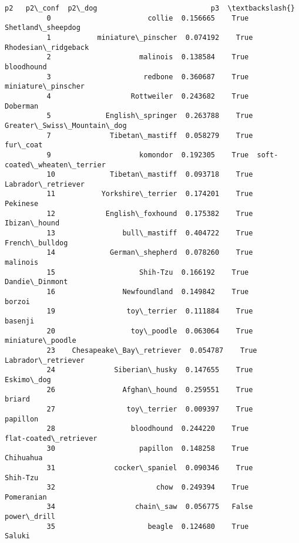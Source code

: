 \documentclass[11pt]{article}
\begin{document}
\begin{Verbatim}[commandchars=\\\{\}]
                                      p2   p2\_conf  p2\_dog                           p3  \textbackslash{}
          0                       collie  0.156665    True            Shetland\_sheepdog   
          1           miniature\_pinscher  0.074192    True          Rhodesian\_ridgeback   
          2                     malinois  0.138584    True                   bloodhound   
          3                      redbone  0.360687    True           miniature\_pinscher   
          4                   Rottweiler  0.243682    True                     Doberman   
          5             English\_springer  0.263788    True   Greater\_Swiss\_Mountain\_dog   
          7              Tibetan\_mastiff  0.058279    True                     fur\_coat   
          9                     komondor  0.192305    True  soft-coated\_wheaten\_terrier   
          10             Tibetan\_mastiff  0.093718    True           Labrador\_retriever   
          11           Yorkshire\_terrier  0.174201    True                     Pekinese   
          12            English\_foxhound  0.175382    True                 Ibizan\_hound   
          13                bull\_mastiff  0.404722    True               French\_bulldog   
          14             German\_shepherd  0.078260    True                     malinois   
          15                    Shih-Tzu  0.166192    True               Dandie\_Dinmont   
          16                Newfoundland  0.149842    True                       borzoi   
          19                 toy\_terrier  0.111884    True                      basenji   
          20                  toy\_poodle  0.063064    True             miniature\_poodle   
          23    Chesapeake\_Bay\_retriever  0.054787    True           Labrador\_retriever   
          24              Siberian\_husky  0.147655    True                   Eskimo\_dog   
          26                Afghan\_hound  0.259551    True                       briard   
          27                 toy\_terrier  0.009397    True                     papillon   
          28                  bloodhound  0.244220    True        flat-coated\_retriever   
          30                    papillon  0.148258    True                    Chihuahua   
          31              cocker\_spaniel  0.090346    True                     Shih-Tzu   
          32                        chow  0.249394    True                   Pomeranian   
          34                   chain\_saw  0.056775   False                  power\_drill   
          35                      beagle  0.124680    True                       Saluki   

\end{Verbatim}
\end{document}
